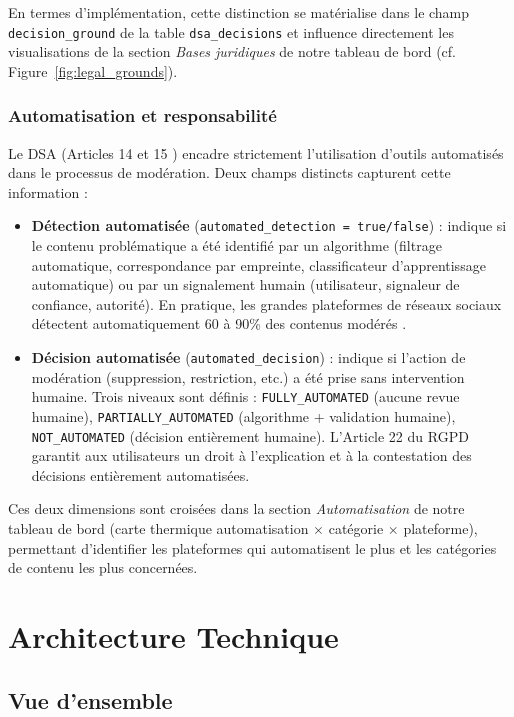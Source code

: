 \documentclass[10pt,twocolumn,a4paper]{article}
\begin{document}
En termes d'implémentation, cette distinction se matérialise dans le champ \texttt{decision\_ground} de la table \texttt{dsa\_decisions} et influence directement les visualisations de la section \textit{Bases juridiques} de notre tableau de bord (cf. Figure~\ref{fig:legal_grounds}).

\subsubsection{Automatisation et responsabilité}

Le DSA (Articles 14 et 15 \cite{dsa2022}) encadre strictement l'utilisation d'outils automatisés dans le processus de modération. Deux champs distincts capturent cette information :

\begin{itemize}
    \item \textbf{Détection automatisée} (\texttt{automated\_detection = true/false}) : indique si le contenu problématique a été identifié par un algorithme (filtrage automatique, correspondance par empreinte, classificateur d'apprentissage automatique) ou par un signalement humain (utilisateur, signaleur de confiance, autorité). En pratique, les grandes plateformes de réseaux sociaux détectent automatiquement 60 à 90\% des contenus modérés \cite{dsadb}.
    \item \textbf{Décision automatisée} (\texttt{automated\_decision}) : indique si l'action de modération (suppression, restriction, etc.) a été prise sans intervention humaine. Trois niveaux sont définis : \texttt{FULLY\_AUTOMATED} (aucune revue humaine), \texttt{PARTIALLY\_AUTOMATED} (algorithme + validation humaine), \texttt{NOT\_AUTOMATED} (décision entièrement humaine). L'Article 22 du RGPD \cite{rgpd} garantit aux utilisateurs un droit à l'explication et à la contestation des décisions entièrement automatisées.
\end{itemize}

Ces deux dimensions sont croisées dans la section \textit{Automatisation} de notre tableau de bord (carte thermique automatisation $\times$ catégorie $\times$ plateforme), permettant d'identifier les plateformes qui automatisent le plus et les catégories de contenu les plus concernées.

\section{Architecture Technique}

\subsection{Vue d'ensemble}
\end{document}
